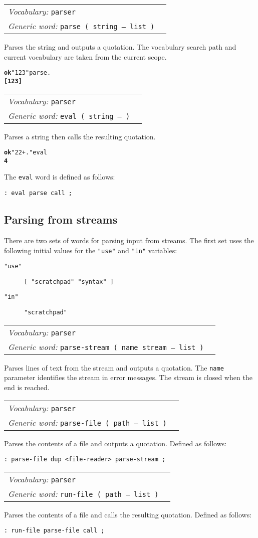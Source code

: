 \documentclass{book}
\newcommand{\vocabulary}[1]{\emph{Vocabulary:} \texttt{#1}&\\}
\newcommand{\genericword}[2]{\index{\texttt{#1}}\emph{Generic word:} \texttt{#2}&\\}
\newcommand{\wordtable}[1]{

\begin{tabularx}{12cm}[t]{lX}
\hline
#1
\hline
\end{tabularx}

}
\begin{document}
\wordtable{
\vocabulary{parser}
\genericword{parse}{parse~( string -- list )}
}
Parses the string and outputs a quotation. The vocabulary search path and current vocabulary are taken from the current scope.
\begin{alltt}
\textbf{ok} "1 2 3" parse .
\textbf{[ 1 2 3 ]}
\end{alltt}

\wordtable{
\vocabulary{parser}
\genericword{eval}{eval~( string -- )}
}
Parses a string then calls the resulting quotation.
\begin{alltt}
\textbf{ok} "2 2 + ." eval
\textbf{4}
\end{alltt}
The \texttt{eval} word is defined as follows:
\begin{verbatim}
: eval parse call ;
\end{verbatim}

\subsection{Parsing from streams}

There are two sets of words for parsing input from streams. The first set uses the following initial values for the \texttt{"use"} and \texttt{"in"} variables:

\begin{description}
\item[\texttt{"use"}] \texttt{[ "scratchpad" "syntax" ]}
\item[\texttt{"in"}] \texttt{"scratchpad"}
\end{description}

\wordtable{
\vocabulary{parser}
\genericword{parse-stream}{parse-stream~( name stream -- list )}
}
Parses lines of text from the stream and outputs a quotation. The \texttt{name} parameter identifies the stream in error messages. The stream is closed when the end is reached.

\wordtable{
\vocabulary{parser}
\genericword{parse-file}{parse-file~( path -- list )}
}
Parses the contents of a file and outputs a quotation. Defined as follows:
\begin{verbatim}
: parse-file dup <file-reader> parse-stream ;
\end{verbatim}
\wordtable{
\vocabulary{parser}
\genericword{run-file}{run-file~( path -- list )}
}
Parses the contents of a file and calls the resulting quotation. Defined as follows:
\begin{verbatim}
: run-file parse-file call ;
\end{verbatim}
\end{document}
